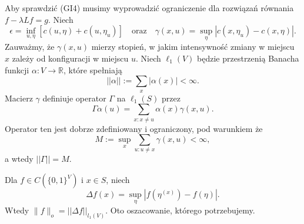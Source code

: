 \documentclass{article}
\begin{document}
	Aby sprawdzić (GI4) musimy wyprowadzić ograniczenie 
	dla rozwiązań równania $f - \lambda Lf = g$. Niech
	\[
		\epsilon = \inf_{u, \eta} [c(u, \eta) + c(u, \eta_u)] \quad \text{oraz} 
		\quad \gamma(x, u) = \sup_\eta |c(x, \eta_u) - c(x, \eta)|.
	\]
	Zauważmy, że $\gamma(x,u)$ mierzy stopień, w jakim intensywność zmiany w miejscu $x$ 
	zależy od konfiguracji w miejscu $u$. 
	Niech $\ell_1(V)$ będzie przestrzenią Banacha 
	funkcji $\alpha : V \to \mathbb{R}$, które spełniają
	\[
		||\alpha|| := \sum_x |\alpha(x)| < \infty.
	\]
	Macierz $\gamma$ definiuje operator $\Gamma$ na $\ell_1(S)$ przez
	\[
		\Gamma \alpha(u) = \sum_{x: x \neq u} \alpha(x) \gamma(x, u).
	\]
	Operator ten jest dobrze zdefiniowany i ograniczony, pod warunkiem że
	\[
		M := \sup_x \sum_{u: u \neq x} \gamma(x, u) < \infty,
	\]
	a wtedy $||\Gamma|| = M$.


	Dla $f \in C(\{0,1\}^V)$ i $x \in S$, niech
	\[
		\Delta f(x) = \sup_{\eta} \left|f\left(\eta^{(x)}\right) - f(\eta)\right|.
	\]
	Wtedy $\|f\|_o = ||\Delta f||_{l_1(V)}$. Oto oszacowanie, którego potrzebujemy.
\end{document}

